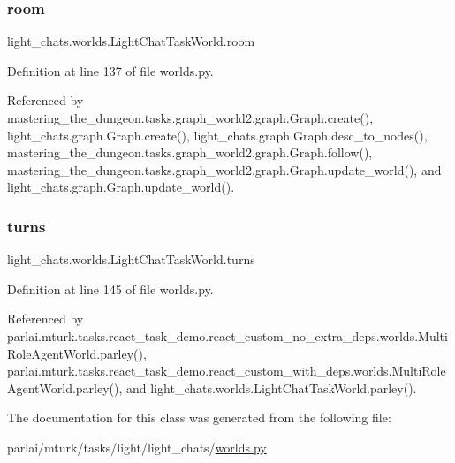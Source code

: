 \subsubsection{\texorpdfstring{room}{room}}
{\footnotesize\ttfamily light\+\_\+chats.\+worlds.\+Light\+Chat\+Task\+World.\+room}



Definition at line 137 of file worlds.\+py.



Referenced by mastering\+\_\+the\+\_\+dungeon.\+tasks.\+graph\+\_\+world2.\+graph.\+Graph.\+create(), light\+\_\+chats.\+graph.\+Graph.\+create(), light\+\_\+chats.\+graph.\+Graph.\+desc\+\_\+to\+\_\+nodes(), mastering\+\_\+the\+\_\+dungeon.\+tasks.\+graph\+\_\+world2.\+graph.\+Graph.\+follow(), mastering\+\_\+the\+\_\+dungeon.\+tasks.\+graph\+\_\+world2.\+graph.\+Graph.\+update\+\_\+world(), and light\+\_\+chats.\+graph.\+Graph.\+update\+\_\+world().

\mbox{\label{classlight__chats_1_1worlds_1_1LightChatTaskWorld_aed1a391087a81f6a87105fcf4d769296}} 
\subsubsection{\texorpdfstring{turns}{turns}}
{\footnotesize\ttfamily light\+\_\+chats.\+worlds.\+Light\+Chat\+Task\+World.\+turns}



Definition at line 145 of file worlds.\+py.



Referenced by parlai.\+mturk.\+tasks.\+react\+\_\+task\+\_\+demo.\+react\+\_\+custom\+\_\+no\+\_\+extra\+\_\+deps.\+worlds.\+Multi\+Role\+Agent\+World.\+parley(), parlai.\+mturk.\+tasks.\+react\+\_\+task\+\_\+demo.\+react\+\_\+custom\+\_\+with\+\_\+deps.\+worlds.\+Multi\+Role\+Agent\+World.\+parley(), and light\+\_\+chats.\+worlds.\+Light\+Chat\+Task\+World.\+parley().



The documentation for this class was generated from the following file\+:\begin{DoxyCompactItemize}
\item 
parlai/mturk/tasks/light/light\+\_\+chats/\hyperlink{parlai_2mturk_2tasks_2light_2light__chats_2worlds_8py}{worlds.\+py}\end{DoxyCompactItemize}
